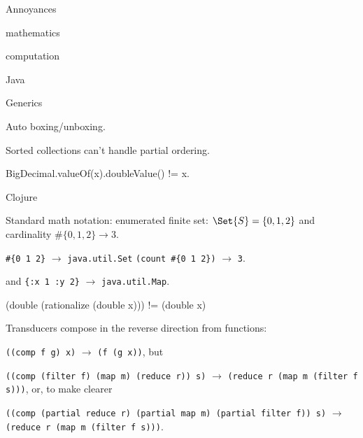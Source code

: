 \begin{plSection}{Annoyances}

\begin{plSection}{mathematics}
\end{plSection}

\begin{plSection}{computation}
\begin{plSection}{Java}
\lstset{language=Java}

Generics

Auto boxing/unboxing.

Sorted collections can't handle partial ordering.

BigDecimal.valueOf(x).doubleValue() != x.

\end{plSection}

\begin{plSection}{Clojure}
\lstset{language=Clojure}

Standard math notation: 
enumerated finite set: $\Set{S} = \{0, 1, 2\}$ 
and cardinality $\#\{0, 1, 2\}
\rightarrow 3$.

\lstinline|#{0 1 2}| $\rightarrow$ \lstinline|java.util.Set|
\lstinline|(count #{0 1 2})| $\rightarrow$
\lstinline|3|.

and
\lstinline|{:x 1 :y 2}| $\rightarrow$ \lstinline|java.util.Map|.

(double (rationalize (double x))) != (double x)

Transducers compose in the reverse direction from functions:

\lstinline|((comp f g) x)| $\rightarrow$
\lstinline|(f (g x))|, but

\lstinline|((comp (filter f) (map m) (reduce r)) s)| $\rightarrow$
\lstinline|(reduce r (map m (filter f s)))|, or, to make clearer


\lstinline|((comp (partial reduce r) (partial map m) (partial filter f)) s)| 
$\rightarrow$ \lstinline|(reduce r (map m (filter f s)))|.

\end{plSection}%
\end{plSection}%
\end{plSection}%